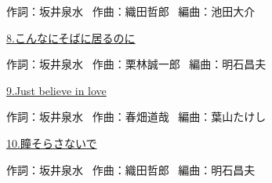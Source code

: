 \tiny{作詞：坂井泉水 \ 作曲：織田哲郎 \ 編曲：池田大介}

\small{\hyperlink{6_7}{8.こんなにそばに居るのに}}

\tiny{作詞：坂井泉水 \ 作曲：栗林誠一郎 \ 編曲：明石昌夫}

\small{\hyperlink{6_8}{9.Just believe in love}}

\tiny{作詞：坂井泉水 \ 作曲：春畑道哉 \ 編曲：葉山たけし}

\small{\hyperlink{6_9}{10.瞳そらさないで}}

\tiny{作詞：坂井泉水 \ 作曲：織田哲郎 \ 編曲：明石昌夫}

\small{ \ }

\tiny{ \ }

\small{ \ }

\tiny{ \ }

\small{ \ }

\tiny{ \ }

\clearpage
